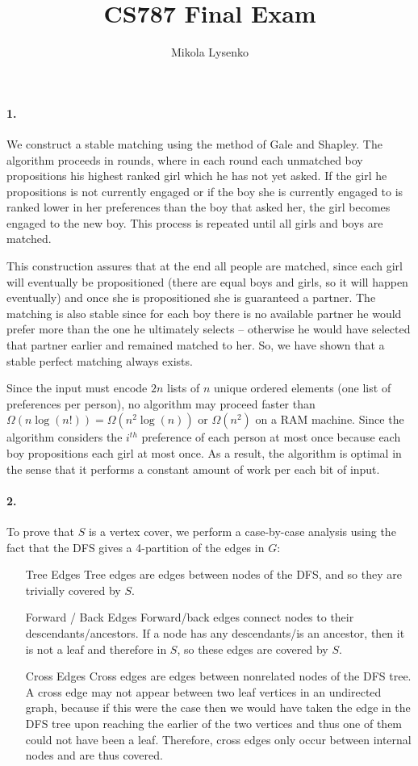 \documentclass{article}
\title{CS787 Final Exam}
\author{Mikola Lysenko}
\begin{document}
\maketitle{}


\paragraph{1.} We construct a stable matching using the method of Gale and Shapley.  The algorithm proceeds in rounds, where in each round each unmatched boy propositions his highest ranked girl which he has not yet asked.  If the girl he propositions is not currently engaged or if the boy she is currently engaged to is ranked lower in her preferences than the boy that asked her, the girl becomes engaged to the new boy.  This process is repeated until all girls and boys are matched.

This construction assures that at the end all people are matched, since each girl will eventually be propositioned (there are equal boys and girls, so it will happen eventually) and once she is propositioned she is guaranteed a partner.  The matching is also stable since for each boy there is no available partner he would prefer more than the one he ultimately selects -- otherwise he would have selected that partner earlier and remained matched to her.  So, we have shown that a stable perfect matching always exists.

Since the input must encode $2n$ lists of $n$ unique ordered elements (one list of preferences per person), no algorithm may proceed faster than $\Omega(n \log(n!)) = \Omega(n^2 \log(n))$ or $\Omega(n^2)$ on a RAM machine.  Since the algorithm considers the $i^{th}$ preference of each person at most once because each boy propositions each girl at most once.  As a result, the algorithm is optimal in the sense that it performs a constant amount of work per each bit of input.

\paragraph{2.}
To prove that $S$ is a vertex cover, we perform a case-by-case analysis using the fact that the DFS gives a 4-partition of the edges in $G$:
\begin{itemize}
\item[Tree Edges] Tree edges are edges between nodes of the DFS, and so they are trivially covered by $S$.
\item[Forward / Back Edges] Forward/back edges connect nodes to their descendants/ancestors.  If a node has any descendants/is an ancestor, then it is not a leaf and therefore in $S$, so these edges are covered by $S$.
\item[Cross Edges] Cross edges are edges between nonrelated nodes of the DFS tree.  A cross edge may not appear between two leaf vertices in an undirected graph, because if this were the case then we would have taken the edge in the DFS tree upon reaching the earlier of the two vertices and thus one of them could not have been a leaf.  Therefore, cross edges only occur between internal nodes and are thus covered.
\end{itemize}
\end{document}
